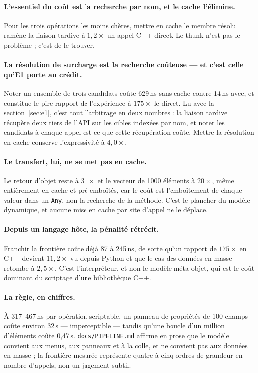 \documentclass[11pt,a4paper]{article}
\newcommand{\code}[1]{\texttt{\small #1}}
\begin{document}
\paragraph{L'essentiel du coût est la recherche par nom, et le cache l'élimine.}
Pour les trois opérations les moins chères, mettre en cache le membre résolu
ramène la liaison tardive à $1{,}2\times$ un appel C++ direct. Le thunk n'est pas
le problème ; c'est de le trouver.

\paragraph{La résolution de surcharge est la recherche coûteuse --- et c'est
celle qu'E1 porte au crédit.} Noter un ensemble de trois candidats coûte 629\,ns
sans cache contre 14\,ns avec, et constitue le pire rapport de l'expérience à
$175\times$ le direct. Lu avec la section~\ref{sec:e1}, c'est tout l'arbitrage en
deux nombres : la liaison tardive récupère deux tiers de l'API sur les cibles
indexées par nom, et noter les candidats à chaque appel est ce que cette
récupération coûte. Mettre la résolution en cache conserve l'expressivité à
$4{,}0\times$.

\paragraph{Le transfert, lui, ne se met pas en cache.} Le retour d'objet reste à
$31\times$ et le vecteur de 1000 éléments à $20\times$, même entièrement en cache
et pré-emboîtés, car le coût est l'emboîtement de chaque valeur dans un
\code{Any}, non la recherche de la méthode. C'est le plancher du modèle
dynamique, et aucune mise en cache par site d'appel ne le déplace.

\paragraph{Depuis un langage hôte, la pénalité rétrécit.} Franchir la frontière
coûte déjà 87 à 245\,ns, de sorte qu'un rapport de $175\times$ en C++ devient
$11{,}2\times$ vu depuis Python et que le cas des données en masse retombe à
$2{,}5\times$. C'est l'interpréteur, et non le modèle méta-objet, qui est le coût
dominant du scriptage d'une bibliothèque C++.

\paragraph{La règle, en chiffres.} À 317--467\,ns par opération scriptable, un
panneau de propriétés de 100 champs coûte environ 32\,\textmu s ---
imperceptible --- tandis qu'une boucle d'un million d'éléments coûte 0,47\,s.
\code{docs/PIPELINE.md} affirme en prose que le modèle convient aux menus, aux
panneaux et à la colle, et ne convient pas aux données en masse ; la frontière
mesurée représente quatre à cinq ordres de grandeur en nombre d'appels, non un
jugement subtil.
\end{document}
